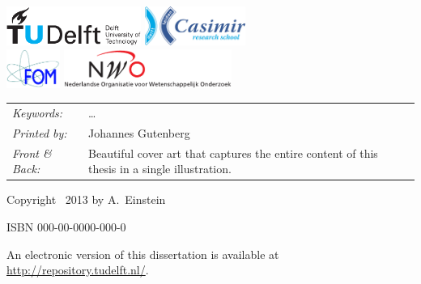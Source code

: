 \begin{titlepage}
\vfill
\begin{center}
    \includegraphics[height=0.5in]{title/logos/tudelft}
    \hspace{2em}
    \includegraphics[height=0.5in]{title/logos/casimir} \\
    \includegraphics[height=0.5in]{title/logos/fom}
    \hspace{2em}
    \includegraphics[height=0.5in]{title/logos/nwo}
\end{center}
\vfill

\noindent
\begin{tabular}{@{}p{}@{}p{}}
    \textit{Keywords:} & \ldots \\[\medskipamount]
    \textit{Printed by:} & Johannes Gutenberg \\[\medskipamount]
    \textit{Front \& Back:} & Beautiful cover art that captures the entire content of this thesis in a single illustration.
\end{tabular}

\vspace{4\bigskipamount}

\noindent Copyright \textcopyright\ 2013 by A.~Einstein


\medskip
\noindent ISBN 000-00-0000-000-0

\medskip
\noindent An electronic version of this dissertation is available at \\
\url{http://repository.tudelft.nl/}.

\end{titlepage}

